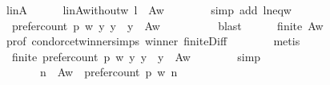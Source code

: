 \begin{isabellebody}
\ l{\isacharunderscore}{\kern0pt}in{\isacharunderscore}{\kern0pt}A\isanewline
\ \ \ \ \isamarkupfalse%
\ l{\isacharunderscore}{\kern0pt}in{\isacharunderscore}{\kern0pt}A{\isacharunderscore}{\kern0pt}without{\isacharunderscore}{\kern0pt}w{\isacharcolon}{\kern0pt}\ {\isachardoublequoteopen}l\ {\isasymin}\ A{\isacharminus}{\kern0pt}{\isacharbraceleft}{\kern0pt}w{\isacharbraceright}{\kern0pt}{\isachardoublequoteclose}\isanewline
\ \ \ \ \ \ \isamarkupfalse%
\ {\isacharparenleft}{\kern0pt}simp\ add{\isacharcolon}{\kern0pt}\ l{\isacharunderscore}{\kern0pt}neq{\isacharunderscore}{\kern0pt}w{\isacharparenright}{\kern0pt}\isanewline
\ \ \ \ \isamarkupfalse%
\ {}{\isacharcolon}{\kern0pt}\ {\isachardoublequoteopen}{\isacharbraceleft}{\kern0pt}prefer{\isacharunderscore}{\kern0pt}count\ p\ w\ y\ {\isacharbar}{\kern0pt}y\ {\isachardot}{\kern0pt}\ y\ {\isasymin}\ A{\isacharminus}{\kern0pt}{\isacharbraceleft}{\kern0pt}w{\isacharbraceright}{\kern0pt}{\isacharbraceright}{\kern0pt}\ {\isasymnoteq}\ {\isacharbraceleft}{\kern0pt}{\isacharbraceright}{\kern0pt}{\isachardoublequoteclose}\isanewline
\ \ \ \ \ \ \isamarkupfalse%
\ blast\isanewline
\ \ \ \ \isamarkupfalse%
\ {\isachardoublequoteopen}finite\ {\isacharparenleft}{\kern0pt}A{\isacharminus}{\kern0pt}{\isacharbraceleft}{\kern0pt}w{\isacharbraceright}{\kern0pt}{\isacharparenright}{\kern0pt}{\isachardoublequoteclose}\isanewline
\ \ \ \ \ \ \isamarkupfalse%
\ prof\ condorcet{\isacharunderscore}{\kern0pt}winner{\isachardot}{\kern0pt}simps\ winner\ finite{\isacharunderscore}{\kern0pt}Diff\isanewline
\ \ \ \ \ \ \isamarkupfalse%
\ metis\isanewline
\ \ \ \ \isamarkupfalse%
\ {}{\isacharcolon}{\kern0pt}\ {\isachardoublequoteopen}finite\ {\isacharbraceleft}{\kern0pt}prefer{\isacharunderscore}{\kern0pt}count\ p\ w\ y\ {\isacharbar}{\kern0pt}y\ {\isachardot}{\kern0pt}\ y\ {\isasymin}\ A{\isacharminus}{\kern0pt}{\isacharbraceleft}{\kern0pt}w{\isacharbraceright}{\kern0pt}{\isacharbraceright}{\kern0pt}{\isachardoublequoteclose}\isanewline
\ \ \ \ \ \ \isamarkupfalse%
\ simp\isanewline
\ \ \ \ \isamarkupfalse%
\ {}\ {}\isanewline
\ \ \ \ \isamarkupfalse%
\ {}{\isacharcolon}{\kern0pt}\isanewline
\ \ \ \ \ \ {\isachardoublequoteopen}{\isasymexists}\ n\ {\isasymin}\ A{\isacharminus}{\kern0pt}{\isacharbraceleft}{\kern0pt}w{\isacharbraceright}{\kern0pt}\ {\isachardot}{\kern0pt}\ prefer{\isacharunderscore}{\kern0pt}count\ p\ w\ n\ {\isacharequal}{\kern0pt}\isanewline

\end{isabellebody}
